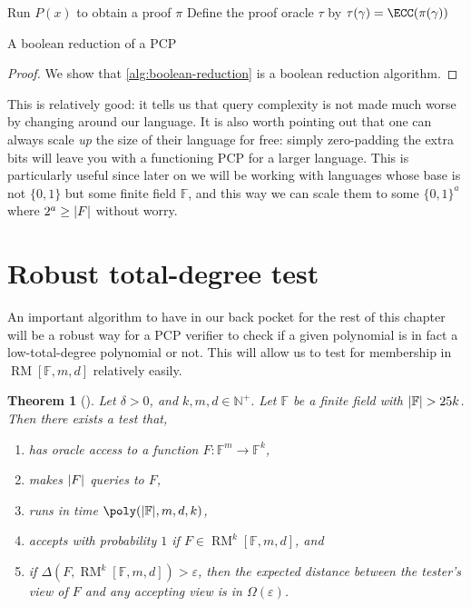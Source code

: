 \documentclass[english,12pt]{reedthesis}
\theoremstyle{plain}
\newtheorem{thm}{Theorem}[section]
\theoremstyle{definition}
\theoremstyle{remark}
\DeclareMathOperator{\RM}{RM}
\DeclarePairedDelimiter{\abs}{\lvert}{\rvert}
\begin{document}
\begin{algorithm}[htbp]
  Run $P(x)$ to obtain a proof $\pi$\;
  Define the proof oracle $\tau$ by $\tau(\gamma) = \ECC(\pi(\gamma))$\;
  \KwRet{$(\pi, \tau)$}\;
  \caption{A boolean reduction of a PCP~\cite[Construction 3.6]{GOS25}}\label{alg:boolean-reduction}
\end{algorithm}

\begin{proof}
  We show that \cref{alg:boolean-reduction} is a boolean reduction algorithm.
\end{proof}

This is relatively good: it tells us that query complexity is not made much
worse by changing around our language. It is also worth pointing out that one
can always scale \emph{up} the size of their language for free: simply
zero-padding the extra bits will leave you with a functioning PCP for a larger
language. This is particularly useful since later on we will be working with
languages whose base is not $\{0, 1\}$ but some finite field $\mathbb{F}$, and
this way we can scale them to some $\{0, 1\}^{a}$ where $2^{a} \ge \abs{F}$
without worry.

\section{Robust total-degree test}\label{sec:robust-degree}

An important algorithm to have in our back pocket for the rest of this chapter
will be a robust way for a PCP verifier to check if a given polynomial is in
fact a low-total-degree polynomial or not. This will allow us to test for
membership in $\RM[\mathbb{F}, m, d]$ relatively easily.

\begin{thm}[{\cite[Prop.\ 5.7]{Par21}}]\label{thm:robust-low-deg}
  Let $\delta > 0$, and $k, m, d \in \mathbb{N}^{+}$. Let $\mathbb{F}$ be a finite field with
  $\abs{\mathbb{F}} > 25k$. Then there exists a test that,
  \begin{enumerate}
    \item has oracle access to a function $F\colon \mathbb{F}^{m} \rightarrow \mathbb{F}^{k}$,
    \item makes $\abs{F}$ queries to $F$,
    \item runs in time $\poly(\abs{\mathbb{F}}, m, d, k)$,
    \item accepts with probability $1$ if $F \in \RM^{k}[\mathbb{F}, m, d]$, and
    \item if $\Delta(F, \RM^{k}[\mathbb{F}, m, d]) > \varepsilon$, then the expected distance
          between the tester's view of $F$ and any accepting view is in $\Omega(\varepsilon)$.
  \end{enumerate}
\end{thm}
\end{document}
